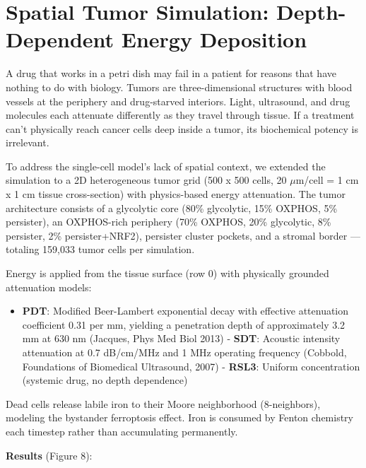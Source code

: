 \documentclass[11pt,twoside,openright]{report}
\begin{document}

\section{Spatial Tumor Simulation: Depth-Dependent Energy Deposition}

A drug that works in a petri dish may fail in a patient for reasons that have nothing to do with biology. Tumors are three-dimensional structures with blood vessels at the periphery and drug-starved interiors. Light, ultrasound, and drug molecules each attenuate differently as they travel through tissue. If a treatment can't physically reach cancer cells deep inside a tumor, its biochemical potency is irrelevant.

To address the single-cell model's lack of spatial context, we extended the simulation to a 2D heterogeneous tumor grid (500 x 500 cells, 20 $\mu$m/cell = 1 cm x 1 cm tissue cross-section) with physics-based energy attenuation. The tumor architecture consists of a glycolytic core (80\% glycolytic, 15\% OXPHOS, 5\% persister), an OXPHOS-rich periphery (70\% OXPHOS, 20\% glycolytic, 8\% persister, 2\% persister+NRF2), persister cluster pockets, and a stromal border --- totaling 159,033 tumor cells per simulation.

Energy is applied from the tissue surface (row 0) with physically grounded attenuation models:

\begin{itemize}
\item \textbf{PDT}: Modified Beer-Lambert exponential decay with effective attenuation coefficient 0.31 per mm, yielding a penetration depth of approximately 3.2 mm at 630 nm (Jacques, Phys Med Biol 2013)
- \textbf{SDT}: Acoustic intensity attenuation at 0.7 dB/cm/MHz and 1 MHz operating frequency (Cobbold, Foundations of Biomedical Ultrasound, 2007)
- \textbf{RSL3}: Uniform concentration (systemic drug, no depth dependence)
\end{itemize}

Dead cells release labile iron to their Moore neighborhood (8-neighbors), modeling the bystander ferroptosis effect. Iron is consumed by Fenton chemistry each timestep rather than accumulating permanently.

\textbf{Results} (Figure 8):
\end{document}
